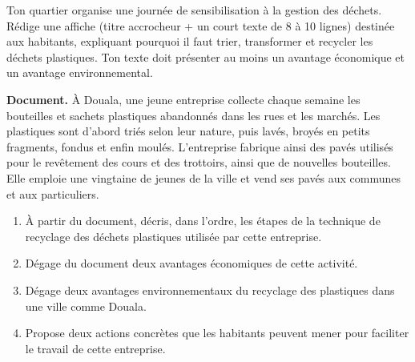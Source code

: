 \documentclass[11pt]{article}
\newcounter{popsec}
\newcounter{popsub}
\newcommand{\courssub}[1]{%
  \stepcounter{popsub}%
  \par\vspace{9pt}\noindent{\popxbold\fontsize{11.5}{13}\selectfont\color{popink}{\color{poporange}\thepopsec.\thepopsub}\hspace{6pt}#1}\par\nopagebreak\vspace{4pt}
}
\begin{document}
\begin{exercice}
Ton quartier organise une journée de sensibilisation à la gestion des déchets. Rédige une affiche (titre accrocheur + un court texte de 8 à 10 lignes) destinée aux habitants, expliquant pourquoi il faut trier, transformer et recycler les déchets plastiques. Ton texte doit présenter au moins un avantage économique et un avantage environnemental.
\end{exercice}

\courssub{Je me prépare au Bac}

\begin{exercice}
\textbf{Document.} À Douala, une jeune entreprise collecte chaque semaine les bouteilles et sachets plastiques abandonnés dans les rues et les marchés. Les plastiques sont d'abord triés selon leur nature, puis lavés, broyés en petits fragments, fondus et enfin moulés. L'entreprise fabrique ainsi des pavés utilisés pour le revêtement des cours et des trottoirs, ainsi que de nouvelles bouteilles. Elle emploie une vingtaine de jeunes de la ville et vend ses pavés aux communes et aux particuliers.
\begin{enumerate}
\item À partir du document, décris, dans l'ordre, les étapes de la technique de recyclage des déchets plastiques utilisée par cette entreprise.
\item Dégage du document deux avantages économiques de cette activité.
\item Dégage deux avantages environnementaux du recyclage des plastiques dans une ville comme Douala.
\item Propose deux actions concrètes que les habitants peuvent mener pour faciliter le travail de cette entreprise.
\end{enumerate}
\end{exercice}
\end{document}
